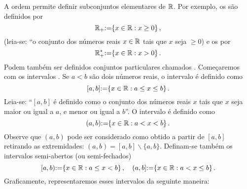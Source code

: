 A ordem permite definir subconjuntos elementares de $\mathbb{R}$. Por exemplo, os  são definidos por 
$$\mathbb{R}_+{:=} \{x\in \mathbb{R}:x\geq 0\}\,,$$
(leia-se: ``o conjunto dos números reais $x\in \mathbb{R}$ tais que $x$ seja $\geq 0$)
e os  por 
$$\mathbb{R}_+^*{:=} \{x\in \mathbb{R}:x> 0\}\,.$$
Podem também ser definidos conjuntos particulares chamados 
. Começaremos com os intervalos .
Se $a<b$ são dois números reais, o intervalo  é
definido como
$$[a,b]{:=} \{x\in \mathbb{R}:a\leq x\leq b\}\,.$$ 
Leia-se: ``$[a,b]$ é definido como o conjunto dos números reais $x$ tais que $x$ seja
maior ou igual a $a$, e menor ou igual a $b$''.
O intervalo  é definido como 
$$(a,b){:=} \{x\in \mathbb{R}:a< x< b\}\,.$$ 
Observe que $(a,b)$ pode ser considerado como obtido a partir de $[a,b]$ retirando as
extremidades: $(a,b)=[a,b]\backslash \{a,b\}$.
Definam-se também os intervalos semi-abertos (ou semi-fechados)
$$[a,b){:=} \{x\in \mathbb{R}:a\leq x< b\}\,,\quad
(a,b]{:=} \{x\in \mathbb{R}:a< x\leq  b\}\,.
$$
Graficamente, representaremos esses intervalos da seguinte maneira:
\begin{center}
\begin{bmlimage}\end{bmlimage}
\end{center}

